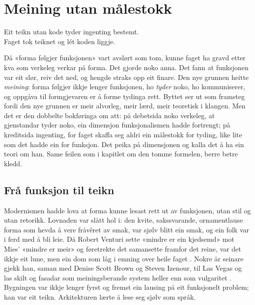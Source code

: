 \chapter{Meining utan målestokk}

\begin{motto}
Eit teikn utan kode tyder ingenting bestemt.\\ Faget tok teiknet og lét koden liggje.
\end{motto}

Då «forma følgjer funksjonen» vart avslørt som tom, kunne faget ha gravd etter kva som verkeleg verkar på forma. Det gjorde noko anna. Det fann at funksjonen var eit slør, reiv det ned, og hengde straks opp eit finare. Den nye grunnen heitte \emph{meining}: forma følgjer ikkje lenger funksjonen, ho \emph{tyder} noko, ho kommuniserer, og oppgåva til formgjevaren er å forme tydinga rett. Byttet ser ut som framsteg fordi den nye grunnen er meir alvorleg, meir lærd, meir teoretisk i klangen. Men det er den dobbelte bokføringa om att: på debetsida noko verkeleg, at gjenstandar tyder noko, ein dimensjon funksjonalismen hadde fortrengt; på kreditsida ingenting, for faget skaffa seg aldri ein målestokk for tyding, like lite som det hadde ein for funksjon. Det peika på dimensjonen og kalla det å ha ein teori om han. Same feilen som i kapitlet om den tomme formelen, berre betre kledd.


\section{Frå funksjon til teikn}

Modernismen hadde lova at forma kunne lesast rett ut av funksjonen, utan stil og utan retorikk. Lovnaden var slått hol i: den kvite, sakssvarande, ornamentlause forma som hevda å vere fråvêret av smak, var sjølv blitt ein smak, og ein folk var i ferd med å bli leie. Då Robert Venturi sette «mindre er ein kjedsemd» mot Mies' «mindre er meir» og føretrekte det samansette framfor det reine, var det ikkje eit lune, men ein dom som låg i emning over heile faget \autocite{venturi1966}. Nokre år seinare gjekk han, saman med Denise Scott Brown og Steven Izenour, til Las Vegas og las skilt og fasadar som meiningsberande system heller enn som vulgaritet \autocite{venturi1972learning}. Bygningen var ikkje lenger fyrst og fremst ein lausing på eit funksjonelt problem; han var eit teikn. Arkitekturen lærte å lese seg sjølv som språk.

